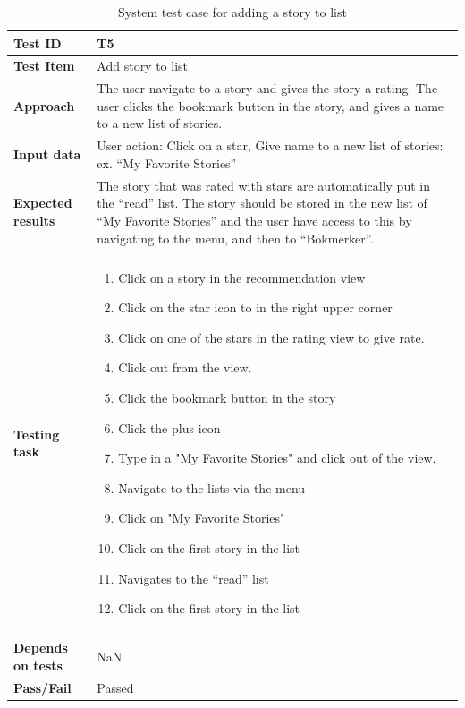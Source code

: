\begin{appendices}
\begin{table}[H]
	\label{Tab:systemTesting4}
	\end{table}


	\begin{table}[H]
		\small
		\centering
		\caption{System test case for adding a story to list}
		\begin{tabular}{ | l | l  |}
			\hline 
			\textbf{Test ID} & T5  \\ \hline
			\textbf{Test Item}  & Add story to list	 \\ \hline
			\textbf{Approach} & \begin{minipage}{5in}The user navigate to a story and gives the story a rating. The user clicks the bookmark button in the story, and gives a name to a new list of stories.   \end{minipage}\\ \hline
			\textbf{Input data} & \begin{minipage}{5in}User action: Click on a star, Give name to a new list of stories: ex. “My Favorite Stories” \end{minipage}\\ \hline
			\textbf{Expected results} & \begin{minipage}{5in}The story that was rated with stars are automatically put in the “read” list. The story should be stored in the new list of “My Favorite Stories” and the user have access to this by navigating to the menu, and then to “Bokmerker”. \end{minipage}\\ \hline&\\[-3.8ex]
			\textbf{Testing task} & \begin{minipage}{5in}
			\begin{enumerate}[noitemsep]
			\item Click on a story in the recommendation view 
			\item Click on the star icon to in the right upper corner 
			\item Click on one of the stars in the rating view to give rate.
			\item Click out from the view. 
			\item Click the bookmark button in the story 
			\item Click the plus icon
			\item Type in a "My Favorite Stories" and click out of the view.
			\item Navigate to the lists via the menu
			\item Click on "My Favorite Stories"
			\item Click on the first story in the list
			\item Navigates to the “read” list
			\item Click on the first story in the list
			\end{enumerate}\end{minipage}
			\\ &\\[-3.8ex]\hline
			\textbf{Depends on tests} & NaN \\ \hline			
			\textbf{Pass/Fail} & Passed \\\hline		
		\end{tabular}
	

\end{table}
\end{appendices}
